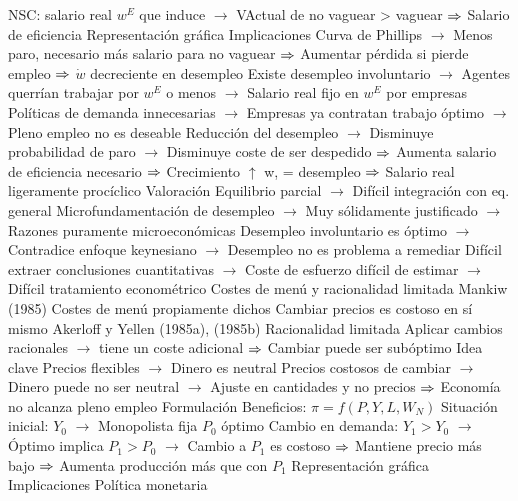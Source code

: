 \documentclass{nuevotema}
\begin{document}
\begin{esquemal}
				\4[] NSC: salario real $w^E$ que induce
				\4[] $\to$ VActual de no vaguear > vaguear
				\4[] $\Rightarrow$ Salario de eficiencia
				\4[] Representación gráfica
				\4[] 
				\4 Implicaciones
				\4[] Curva de Phillips
				\4[] $\to$ Menos paro, necesario más salario para no vaguear
				\4[] $\Rightarrow$ Aumentar pérdida si pierde empleo
				\4[] $\Rightarrow$ $\dot{w}$ decreciente en desempleo
				\4[] Existe desempleo involuntario
				\4[] $\to$ Agentes querrían trabajar por $w^E$ o menos
				\4[] $\to$ Salario real fijo en $w^E$ por empresas
				\4[] Políticas de demanda innecesarias
				\4[] $\to$ Empresas ya contratan trabajo óptimo
				\4[] $\to$ Pleno empleo no es deseable
				\4[] Reducción del desempleo
				\4[] $\to$ Disminuye probabilidad de paro
				\4[] $\to$ Disminuye coste de ser despedido
				\4[] $\Rightarrow$ Aumenta salario de eficiencia necesario
				\4[] $\Rightarrow$ Crecimiento $\uparrow$ w, = desempleo
				\4[] $\Rightarrow$ Salario real ligeramente procíclico
				\4 Valoración
				\4[] Equilibrio parcial
				\4[] $\to$ Difícil integración con eq. general
				\4[] Microfundamentación de desempleo
				\4[] $\to$ Muy sólidamente justificado
				\4[] $\to$ Razones puramente microeconómicas
				\4[] Desempleo involuntario es óptimo
				\4[] $\to$ Contradice enfoque keynesiano
				\4[] $\to$ Desempleo no es problema a remediar
				\4[] Difícil extraer conclusiones cuantitativas
				\4[] $\to$ Coste de esfuerzo difícil de estimar
				\4[] $\to$ Difícil tratamiento econométrico
			\3 Costes de menú y racionalidad limitada
				\4 Mankiw (1985)
				\4[] Costes de menú propiamente dichos
				\4[] Cambiar precios es costoso en sí mismo
				\4 Akerloff y Yellen (1985a), (1985b)
				\4[] Racionalidad limitada
				\4[] Aplicar cambios racionales
				\4[] $\to$ tiene un coste adicional
				\4[] $\Rightarrow$ Cambiar puede ser subóptimo
				\4 Idea clave
				\4[] Precios flexibles
				\4[] $\to$ Dinero es neutral
				\4[] Precios costosos de cambiar
				\4[] $\to$ Dinero puede no ser neutral
				\4[] $\to$ Ajuste en cantidades y no precios
				\4[] $\Rightarrow$ Economía no alcanza pleno empleo
				\4 Formulación
				\4[] Beneficios: $\pi = f(P, Y, L, W_N)$
				\4[] Situación inicial: $Y_0$
				\4[] $\to$ Monopolista fija $P_0$ óptimo
				\4[] Cambio en demanda: $Y_1 > Y_0$
				\4[] $\to$ Óptimo implica $P_1 > P_0$
				\4[] $\to$ Cambio a $P_1$ es costoso
				\4[] $\Rightarrow$ Mantiene precio más bajo
				\4[] $\Rightarrow$ Aumenta producción más que con $P_1$
				\4[] Representación gráfica
				\4[] 
				\4 Implicaciones
				\4[] Política monetaria

\end{esquemal}
\end{document}
